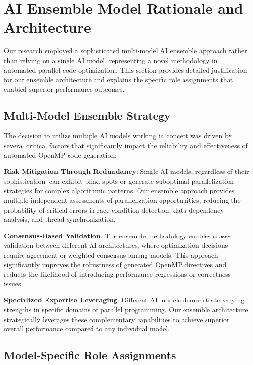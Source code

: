 

\section{AI Ensemble Model Rationale and Architecture}

Our research employed a sophisticated multi-model AI ensemble approach rather than relying on a single AI model, representing a novel methodology in automated parallel code optimization. This section provides detailed justification for our ensemble architecture and explains the specific role assignments that enabled superior performance outcomes.

\subsection{Multi-Model Ensemble Strategy}

The decision to utilize multiple AI models working in concert was driven by several critical factors that significantly impact the reliability and effectiveness of automated OpenMP code generation:

\textbf{Risk Mitigation Through Redundancy}: Single AI models, regardless of their sophistication, can exhibit blind spots or generate suboptimal parallelization strategies for complex algorithmic patterns. Our ensemble approach provides multiple independent assessments of parallelization opportunities, reducing the probability of critical errors in race condition detection, data dependency analysis, and thread synchronization.

\textbf{Consensus-Based Validation}: The ensemble methodology enables cross-validation between different AI architectures, where optimization decisions require agreement or weighted consensus among models. This approach significantly improves the robustness of generated OpenMP directives and reduces the likelihood of introducing performance regressions or correctness issues.

\textbf{Specialized Expertise Leveraging}: Different AI models demonstrate varying strengths in specific domains of parallel programming. Our ensemble architecture strategically leverages these complementary capabilities to achieve superior overall performance compared to any individual model.

\subsection{Model-Specific Role Assignments}

